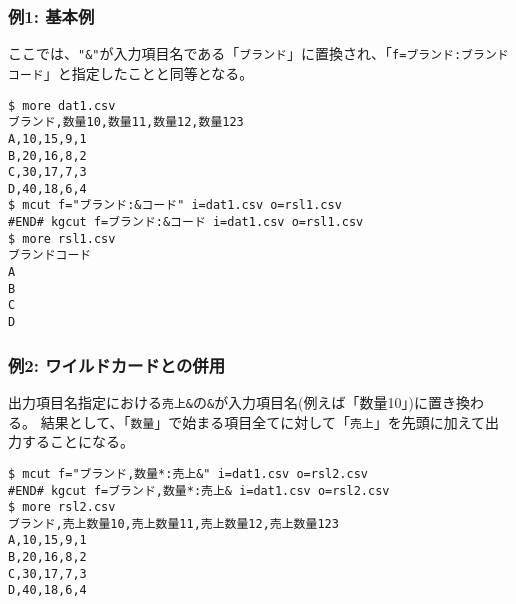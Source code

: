 \subsubsection*{例1: 基本例}

ここでは、\verb|"&"|が入力項目名である「\verb|ブランド|」に置換され、「\verb|f=ブランド:ブランドコード|」と指定したことと同等となる。


\begin{Verbatim}[baselinestretch=0.7,frame=single]
$ more dat1.csv
ブランド,数量10,数量11,数量12,数量123
A,10,15,9,1
B,20,16,8,2
C,30,17,7,3
D,40,18,6,4
$ mcut f="ブランド:&コード" i=dat1.csv o=rsl1.csv
#END# kgcut f=ブランド:&コード i=dat1.csv o=rsl1.csv
$ more rsl1.csv
ブランドコード
A
B
C
D
\end{Verbatim}
\subsubsection*{例2: ワイルドカードとの併用}

出力項目名指定における\verb|売上&|の\verb|&|が入力項目名(例えば「数量10」)に置き換わる。
結果として、「\verb|数量|」で始まる項目全てに対して「\verb|売上|」を先頭に加えて出力することになる。


\begin{Verbatim}[baselinestretch=0.7,frame=single]
$ mcut f="ブランド,数量*:売上&" i=dat1.csv o=rsl2.csv
#END# kgcut f=ブランド,数量*:売上& i=dat1.csv o=rsl2.csv
$ more rsl2.csv
ブランド,売上数量10,売上数量11,売上数量12,売上数量123
A,10,15,9,1
B,20,16,8,2
C,30,17,7,3
D,40,18,6,4
\end{Verbatim}
